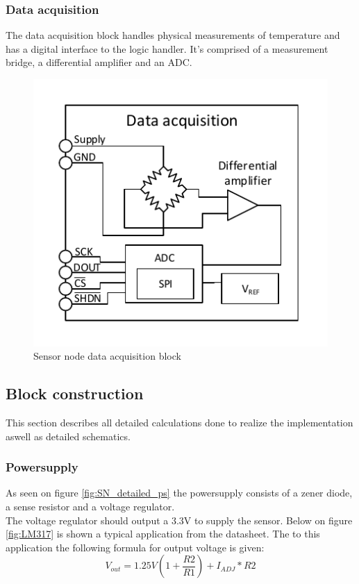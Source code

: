 \subsubsection{Data acquisition}

The data acquisition block handles physical measurements of temperature and has a digital interface to the logic handler. It's comprised of a measurement bridge, a differential amplifier and an ADC.

\begin{figure}[H]
	\centering
	\includegraphics[width=.5\textwidth]{billeder/data_aqcuisition_sn}
	\caption{Sensor node data acquisition block}
	\label{fig:sn_data_acquisition}
\end{figure}




\subsection{Block construction}
This section describes all detailed calculations done to realize the implementation aswell as detailed schematics.\\

\subsubsection{Powersupply}
As seen on figure \ref{fig:SN_detailed_ps} the powersupply consists of a zener diode, a sense resistor and a voltage regulator.\\
The voltage regulator should output a 3.3V to supply the sensor. Below on figure \ref{fig:LM317} is shown a typical application from the datasheet. The to this application the following formula for output voltage is given:\\
\begin{equation}
	V_{out}=1.25V\left(1+\frac{R2}{R1}\right)+ I_{ADJ}*R2
\end{equation}

